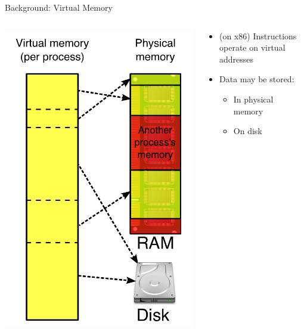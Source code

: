 \documentclass[aspectratio=169]{beamer}
\newcommand{\bi}{\begin{itemize}}
\newcommand{\ei}{\end{itemize}}
\begin{document}
\begin{frame}{Background: Virtual Memory}
  \begin{columns}[T]
    \begin{column}{0.3\textwidth}
      \includegraphics[scale=0.2]{./figures/Virtual_memory.png}
    \end{column}
    \begin{column}{0.7\textwidth}
      \bi
    \item (on x86) Instructions operate on virtual addresses
      \pause
    \item Data may be stored:
      \bi
    \item In physical memory
    \item On disk
      \ei
      \ei
    \end{column}
  \end{columns}
\end{frame}
\end{document}
